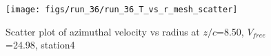 \begin{figure}[H]
\centering
\texttt{[image: figs/run\_36/run\_36\_T\_vs\_r\_mesh\_scatter]}
\caption{Scatter plot of azimuthal velocity vs radius at $z/c$=8.50, $V_{free}$=24.98, station4}
\label{fig:run_36_T_vs_r_mesh_scatter}
\end{figure}


